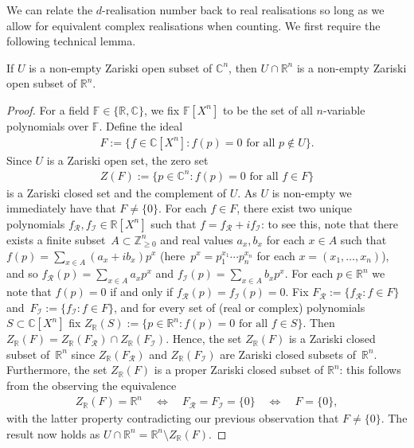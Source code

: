 We can relate the $d$-realisation number back to real realisations so long as we allow for equivalent complex realisations when counting.
We first require the following technical lemma.

\begin{lemma}\label{l:realzar}
	If $U$ is a non-empty Zariski open subset of $\mathbb{C}^n$, then $U \cap \mathbb{R}^n$ is a non-empty Zariski open subset of $\mathbb{R}^n$.
\end{lemma}

\begin{proof}
	For a field $\mathbb{F} \in \{ \mathbb{R}, \mathbb{C}\}$,
	we fix $\mathbb{F}[X^n]$ to be the set of all $n$-variable polynomials over $\mathbb{F}$.
	Define the ideal 
	\begin{align*}
		F := \{ f \in \mathbb{C}[X^n] : f(p) = 0 \text{ for all } p \notin U\}.
	\end{align*}
	Since $U$ is a Zariski open set,
	the zero set
	\begin{align*}
		Z(F) := \{p \in \mathbb{C}^n: f(p) = 0 \text{ for all } f \in F\}
	\end{align*}
	is a Zariski closed set and the complement of $U$.
	As $U$ is non-empty we immediately have that $F \neq \{0\}$.
	For each $f \in F$,
	there exist two unique polynomials \mbox{$f_{\mathcal{R}},f_{\mathcal{I}} \in \mathbb{R}[X^n]$} such that $f = f_{\mathcal{R}}+ i f_{\mathcal{I}}$:
	to see this, note that there exists a finite subset~$A \subset \mathbb{Z}^n_{\geq 0}$ and real values $a_x,b_x $ for each $x \in A$ such that $f(p) = \sum_{x \in A} (a_x + i b_x) p^x$ (here~$p^x = p_1^{x_1} \cdots p_n^{x_n}$ for each $x=(x_1,\ldots,x_n)$),
	and so $f_{\mathcal{R}}(p) = \sum_{x \in A} a_x p^x$ and $f_{\mathcal{I}}(p) = \sum_{x \in A} b_x p^x$.
	For each $p \in \mathbb{R}^n$ we note that $f(p) = 0$ if and only if $f_{\mathcal{R}}(p) = f_{\mathcal{I}}(p) = 0$.
	Fix $F_\mathcal{R} := \{ f_{\mathcal{R}} :f \in F\}$ and~$F_\mathcal{I} := \{ f_{\mathcal{I}} :f \in F\}$,
	and for every set of (real or complex) polynomials $S \subset \mathbb{C}[X^n]$ fix $Z_{\mathbb{R}}(S):= \{p \in \mathbb{R}^n : f(p) = 0 \text{ for all } f \in S \}$.
	Then $Z_{\mathbb{R}}(F) = Z_{\mathbb{R}}(F_{\mathcal{R}}) \cap Z_{\mathbb{R}}(F_{\mathcal{I}})$.
	Hence, the set $Z_{\mathbb{R}}(F)$ is a Zariski closed subset of~$\mathbb{R}^n$ since $Z_{\mathbb{R}}(F_{\mathcal{R}})$ and $Z_{\mathbb{R}}(F_{\mathcal{I}})$ are Zariski closed subsets of~$\mathbb{R}^n$.
	Furthermore,
	the set $Z_{\mathbb{R}}(F)$ is a proper Zariski closed subset of $\mathbb{R}^n$:
	this follows from the observing the equivalence
	\begin{align*}
		Z_{\mathbb{R}}(F) = \mathbb{R}^n \quad \Leftrightarrow \quad F_{\mathcal{R}} = F_{\mathcal{I}} = \{0\}  \quad \Leftrightarrow \quad F= \{0\},
	\end{align*}
	with the latter property contradicting our previous observation that $F \neq \{0\}$.
	The result now holds as $U \cap \mathbb{R}^n = \mathbb{R}^n \setminus Z_{\mathbb{R}}(F)$.
\end{proof}

